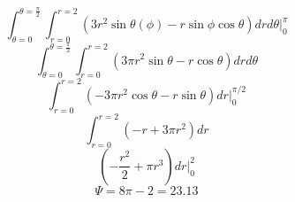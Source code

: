 \documentclass[14pt]{extarticle}
\begin{document}
\[
	\int_{\theta=0}^{\theta=\frac{\pi}{2}}\int_{r=0}^{r=2}\left(3r^2\sin\theta(\phi)-r\sin\phi\cos\theta\right)dr d\theta \bigg|_0^{\pi}
\]
\[
	\int_{\theta=0}^{\theta=\frac{\pi}{2}}\int_{r=0}^{r=2}\left(3\pi r^2\sin\theta-r\cos{\theta}\right)dr d\theta
\]
\[
	\int_{r=0}^{r=2}\left(-3\pi r^2\cos\theta-r\sin\theta\right)dr \bigg|_0^{\pi / 2}
\]
\[
	\int_{r=0}^{r=2}\left(-r+3\pi r^2\right)dr
\]
\[
	\left(-\frac{r^2}{2}+\pi r^3\right)dr \bigg|_0^2
\]
\[
	\Psi=8\pi-2=23.13
\]
\end{document}
